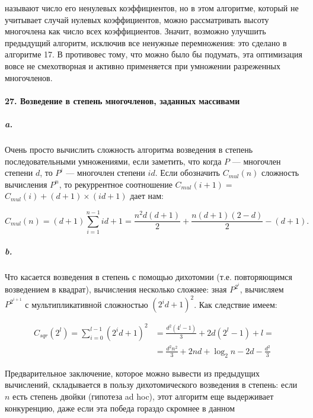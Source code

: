 \documentclass{../../template/mai_book}
\begin{document}
\noindent
называют число его ненулевых коэффициентов, но в этом алгоритме, который не учитывает случай нулевых коэффициентов, можно рассматривать высоту многочлена как число всех коэффициентов. Значит, возможно улучшить предыдущий алгоритм, исключив все ненужные перемножения: это сделано в алгоритме 17. В противовес тому, что можно было бы подумать, эта оптимизация вовсе не смехотворная и активно применяется при умножении разреженных многочленов.

\paragraph{27. Возведение в степень многочленов, заданных массивами}

\subparagraph{a.} Очень просто вычислить сложность алгоритма возведения в степень последовательными умножениями, если заметить, что когда $P$ — многочлен степени $d$, то $P^i$ — многочлен степени $id$. Если обозначить $C_{mul}(n)$ сложность вычисления $P^n$, то рекуррентное соотношение $C_{mul}(i + 1) =$ \linebreak $C_{mul}(i) + (d + 1) \times (id + 1)$ дает нам:

\begin{equation*}
C_{mul}(n) = (d + 1) \sum_{i = 1}^{n - 1} id + 1 = \frac{n^2 d(d + 1)}{2} + \frac{n(d + 1)(2 - d)}{2} - (d + 1).
\end{equation*}

\subparagraph{b.} Что касается возведения в степень с помощью дихотомии (т.е. повторяющимся возведением в квадрат), вычисления несколько сложнее: зная $P^{2^i}$, вычисляем $P^{2^{i + 1}}$ с мультипликативной сложностью $(2^i d + 1)^2$. Как следствие имеем:

\begin{equation*}
	\begin{split}
	C_{sqr}(2^l) = \sum_{i = 0}^{l - 1} (2^i d + 1)^2 &= \frac{d^2 (4^l - 1)}{3} + 2d(2^l - 1) + l =
	\\
	&= \frac{d^2 n^2}{3} + 2nd + \log_2 n - 2d - \frac{d^2}{3}
	\end{split}
\end{equation*}

\noindent
Предварительное заключение, которое можно вывести из предыдущих вычислений, складывается в пользу дихотомического возведения в степень: если $n$ есть степень двойки (гипотеза ad hoc), этот алгоритм еще выдерживает конкуренцию, даже если эта победа гораздо скромнее в данном \linebreak
\end{document}
